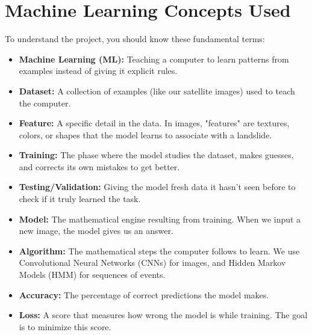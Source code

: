 \documentclass[12pt,a4paper]{article}
\begin{document}
\section{Machine Learning Concepts Used}
To understand the project, you should know these fundamental terms:
\begin{itemize}
    \item \textbf{Machine Learning (ML):} Teaching a computer to learn patterns from examples instead of giving it explicit rules.
    \item \textbf{Dataset:} A collection of examples (like our satellite images) used to teach the computer.
    \item \textbf{Feature:} A specific detail in the data. In images, "features" are textures, colors, or shapes that the model learns to associate with a landslide.
    \item \textbf{Training:} The phase where the model studies the dataset, makes guesses, and corrects its own mistakes to get better.
    \item \textbf{Testing/Validation:} Giving the model fresh data it hasn't seen before to check if it truly learned the task.
    \item \textbf{Model:} The mathematical engine resulting from training. When we input a new image, the model gives us an answer.
    \item \textbf{Algorithm:} The mathematical steps the computer follows to learn. We use Convolutional Neural Networks (CNNs) for images, and Hidden Markov Models (HMM) for sequences of events.
    \item \textbf{Accuracy:} The percentage of correct predictions the model makes.
    \item \textbf{Loss:} A score that measures how wrong the model is while training. The goal is to minimize this score.
\end{itemize}
\end{document}
